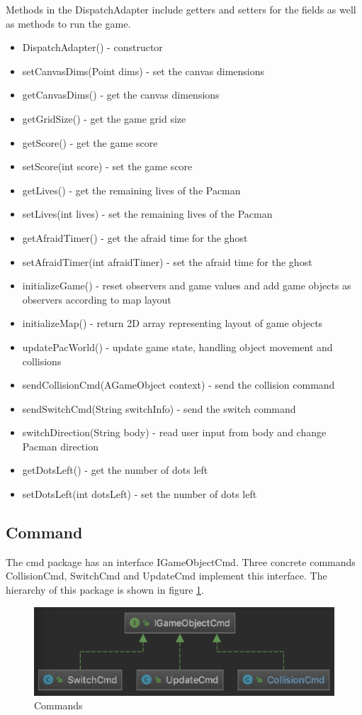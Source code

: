 \documentclass[letterpaper, 11pt]{article}
\begin{document}
Methods in the DispatchAdapter include getters and setters for the fields as well as methods to run the game.
\begin{itemize}
  \item DispatchAdapter() - constructor
  \item setCanvasDims(Point dims) - set the canvas dimensions
  \item getCanvasDims() - get the canvas dimensions
  \item getGridSize() - get the game grid size
  \item getScore() - get the game score
  \item setScore(int score) - set the game score
  \item getLives() - get the remaining lives of the Pacman
  \item setLives(int lives) - set the remaining lives of the Pacman
  \item getAfraidTimer() - get the afraid time for the ghost
  \item setAfraidTimer(int afraidTimer) - set the afraid time for the ghost
  \item initializeGame() - reset observers and game values and add game objects as observers according to map layout
  \item initializeMap() - return 2D array representing layout of game objects
  \item updatePacWorld() - update game state, handling object movement and collisions
  \item sendCollisionCmd(AGameObject context) - send the collision command
  \item sendSwitchCmd(String switchInfo) - send the switch command
  \item switchDirection(String body) - read user input from body and change Pacman direction
  \item getDotsLeft() - get the number of dots left
  \item setDotsLeft(int dotsLeft) - set the number of dots left
 \end{itemize}
 
\subsection{Command}
The cmd package has an interface IGameObjectCmd. Three concrete commands CollisionCmd, SwitchCmd and UpdateCmd implement this interface. The hierarchy of this package is shown in figure \ref{figcmd}. 

\begin{figure}[htbp] 
  \centering
  \includegraphics[width=.85\linewidth]{cmd.png} 
  \caption{Commands}
  \label{figcmd} 
\end{figure}
\end{document}
